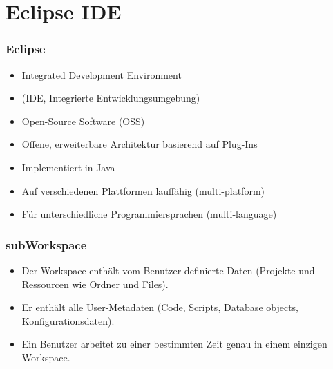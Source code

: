 
\part{Eclipse IDE}

\begin{multicols}{2}
\section{Eclipse}
\begin{itemize}
	\item Integrated Development Environment
	\item[\-] (IDE, Integrierte Entwicklungsumgebung)
	\item Open-Source Software (OSS)
	\item Offene, erweiterbare Architektur basierend auf Plug-Ins
	\item Implementiert in Java
	\item Auf verschiedenen Plattformen lauffähig (multi-platform)
	\item Für unterschiedliche Programmiersprachen (multi-language)
\end{itemize}
\vfill\null
\columnbreak
\section{subWorkspace}
\begin{itemize}
	\item Der Workspace enthält vom Benutzer definierte Daten (Projekte und Ressourcen wie Ordner und Files).
	\item Er enthält alle User-Metadaten (Code, Scripts, Database objects, Konfigurationsdaten).
	\item Ein Benutzer arbeitet zu einer bestimmten Zeit genau in einem einzigen Workspace.
\end{itemize}
\end{multicols}

